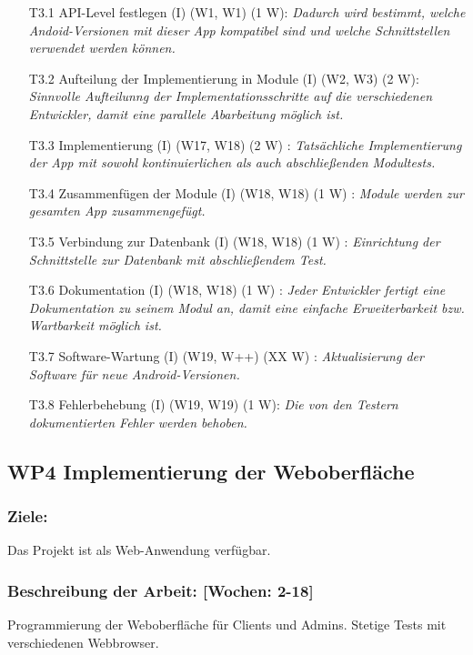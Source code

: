 \documentclass{report}
\begin{document}
\begin{enumerate}
\item [T3.1] API-Level festlegen (I) (W1, W1) (1 W): \emph{ Dadurch wird bestimmt, welche Andoid-Versionen mit dieser App kompatibel sind und welche Schnittstellen verwendet werden können.}
\item [T3.2] Aufteilung der Implementierung in Module (I) (W2, W3) (2 W): \emph{ Sinnvolle Aufteilunng der Implementationsschritte auf die verschiedenen Entwickler, damit eine parallele Abarbeitung möglich ist.}
\item [T3.3] Implementierung (I) (W17, W18) (2 W) : \emph{ Tatsächliche Implementierung der App mit sowohl kontinuierlichen als auch abschließenden Modultests.}
\item [T3.4] Zusammenfügen der Module (I) (W18, W18) (1 W) : \emph{ Module werden zur gesamten App zusammengefügt.}
\item [T3.5] Verbindung zur Datenbank (I) (W18, W18) (1 W) : \emph{ Einrichtung der Schnittstelle zur Datenbank mit abschließendem Test.}
\item [T3.6] Dokumentation (I) (W18, W18) (1 W) : \emph{ Jeder Entwickler fertigt eine Dokumentation zu seinem Modul an, damit eine einfache Erweiterbarkeit bzw. Wartbarkeit möglich ist.}
\item [T3.7] Software-Wartung (I) (W19, W++) (XX W) : \emph{ Aktualisierung der Software für neue Android-Versionen.}
\item [T3.8] Fehlerbehebung (I) (W19, W19) (1 W): \emph{Die von den Testern dokumentierten Fehler werden behoben.}
\end{enumerate}

\subsection*{WP4 Implementierung der Weboberfläche}

\subsubsection{Ziele:} Das Projekt ist als Web-Anwendung verfügbar.
\subsubsection{Beschreibung der Arbeit: [Wochen: 2-18]} Programmierung der Weboberfläche für Clients und Admins. Stetige Tests mit verschiedenen Webbrowser.
\end{document}
